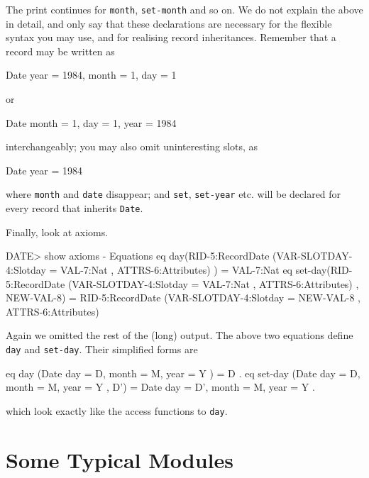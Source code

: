 \documentclass[a4paper]{memoir}
\begin{document}
The print continues for \verb|month|, \verb|set-month| and so on.
We do not explain the above in detail, and only say that these
declarations are necessary for the flexible syntax you may use, and
for realising record inheritances. Remember that a record may be written as
\begin{vvtm}
\begin{ccode}
  Date { year = 1984, month = 1, day = 1 }
\end{ccode}
\end{vvtm}
or
\begin{vvtm}
\begin{ccode}
  Date { month = 1, day = 1, year = 1984 }
\end{ccode}
\end{vvtm}
interchangeably; you may also omit uninteresting slots, as
\begin{vvtm}
\begin{ccode}
  Date { year = 1984 }
\end{ccode}
\end{vvtm}
where \verb|month| and \verb|date| disappear;
and \verb|set|, \verb|set-year| etc. will be declared for every record
that inherits \verb|Date|.

Finally, look at axioms.
\begin{vvtm}
\begin{ccode}
  DATE> show axioms
  - Equations
    eq day(RID-5:RecordDate { (VAR-SLOTDAY-4:Slotday = VAL-7:Nat , 
           ATTRS-6:Attributes) }) = VAL-7:Nat
    eq set-day(RID-5:RecordDate { (VAR-SLOTDAY-4:Slotday = VAL-7:Nat , 
           ATTRS-6:Attributes) }, NEW-VAL-8) 
       = RID-5:RecordDate { (VAR-SLOTDAY-4:Slotday = NEW-VAL-8 , 
           ATTRS-6:Attributes) }
\end{ccode}
\end{vvtm}
Again we omitted the rest of the (long) output. The above two equations
define \verb|day| and \verb|set-day|. Their simplified forms are
\begin{vvtm}
\begin{ccode}
  eq day (Date { day = D, month = M, year = Y }) = D .
  eq set-day (Date { day = D, month = M, year = Y }, D') =
        Date { day = D', month = M, year = Y } .
\end{ccode}
\end{vvtm}
which look exactly like the access functions to \verb|day|.

\section{Some Typical Modules}\label{sec:p2-typical-modules}
\end{document}
